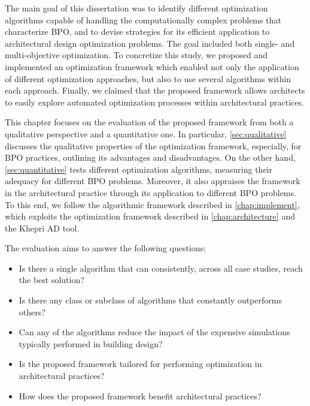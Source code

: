 \label{chap:evaluation}
 
The main goal of this dissertation was to identify different optimization algorithms capable of handling the computationally complex problems that characterize \ac{BPO}, and to devise strategies for its efficient application to architectural design optimization problems. The goal included both single- and multi-objective optimization. To concretize this study, we proposed and implemented an optimization framework which enabled not only the application of different optimization approaches, but also to use several algorithms within each approach.  Finally, we claimed that the proposed framework allows architects to easily explore automated optimization processes within architectural practices. 

This chapter focuses on the evaluation of the proposed framework from both a qualitative perspective and a quantitative one. In particular, \cref{sec:qualitative} discusses the qualitative properties of the optimization framework, especially, for \ac{BPO} practices, outlining its advantages and disadvantages. On the other hand, \cref{sec:quantitative} tests different optimization algorithms, measuring their adequacy for different \ac{BPO} problems. Moreover, it also appraises the framework in the architectural practice through its application to different \ac{BPO} problems. To this end, we follow the algorithmic framework described in \cref{chap:implement}, which exploits the optimization framework described in \cref{chap:architecture} and the Khepri \ac{AD} tool. 

The evaluation aims to answer the following questions: 
\begin{itemize}
	\item Is there a single algorithm that can consistently, across all case studies, reach the best solution?
	\item Is there any class or subclass of algorithms that constantly outperforms others?
	\item Can any of the algorithms reduce the impact of the expensive simulations typically performed in building design? 
	\item Is the proposed framework tailored for performing optimization in architectural practices? 
	\item How does the proposed framework benefit architectural practices?
\end{itemize}


